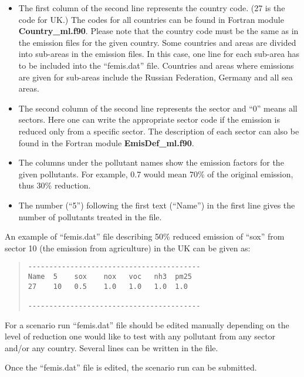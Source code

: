 \begin{itemize}

\item The first column of
the second line represents the country code. (27 is the code for UK.)
The codes for all countries can be found in  Fortran module {\bf
  Country\_ml.f90}. Please note that the country code must be the same
as in the emission files for the given country. Some
countries and areas are divided into sub-areas in the emission
files. In this case, one line for each sub-area has to be included
into the ``femis.dat'' file. Countries and areas where emissions are
given for sub-areas include the Russian Federation, Germany and all 
sea areas.    

\item The second
column of the second line 
represents the sector and ``0'' means all sectors. Here one can write
the appropriate sector code if the emission is reduced only from a specific
sector. The description of each sector can also be found in the Fortran
module {\bf EmisDef\_ml.f90}. 

\item The columns under the pollutant names show the emission factors
  for the given pollutants. For example, 0.7 would mean 70\% of the
  original emission, thus 30\% reduction.


\item The number (``5'') following
the first text (``Name'') in the first line gives the number of
pollutants treated in the file.   
              
\end{itemize}
\newpage

An example of ``femis.dat'' file describing 50\% reduced emission of
``sox'' from sector 10 (the emission from agriculture) in the UK can be given as:  
\begin{quote}
\begin{verbatim}
-----------------------------------------
Name  5    sox    nox   voc   nh3  pm25 
27    10   0.5    1.0   1.0   1.0  1.0   

-----------------------------------------
\end{verbatim}        
\end{quote}
For a scenario run ``femis.dat'' file should be edited 
manually depending on the level of
reduction one would like to test with any pollutant from any sector
and/or any country. Several lines can be written in the file.

Once the ``femis.dat''  file is
edited, the scenario run can be submitted.  



